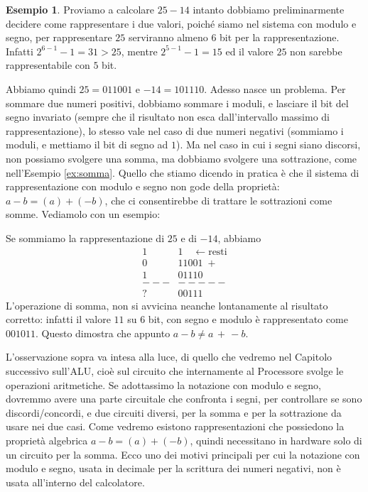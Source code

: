 \documentclass[a4paper]{book}
\theoremstyle{definition}
\newtheorem{ex}{Esempio}
\begin{document}
\begin{ex} Proviamo a calcolare $25 - 14$ intanto dobbiamo preliminarmente decidere come rappresentare i due valori, poiché siamo nel sistema con modulo e segno, per rappresentare $25$ serviranno almeno $6$ bit per la rappresentazione. Infatti $2^{6-1}-1 = 31 > 25$, mentre $2^{5-1}-1 = 15$ ed il valore $25$ non sarebbe rappresentabile con $5$ bit. 

Abbiamo quindi $25 = 011001$ e  $-14 = 101110$. Adesso nasce un problema. 
Per sommare due numeri positivi, dobbiamo sommare i moduli, e lasciare il bit
del segno invariato (sempre che il risultato non esca dall'intervallo massimo
di rappresentazione), lo stesso vale nel caso di due numeri negativi (sommiamo
i moduli, e mettiamo il bit di segno ad $1$). Ma nel caso in cui i segni siano
discorsi, non possiamo svolgere una somma, ma dobbiamo svolgere una sottrazione,
come nell'Esempio \ref{ex:somma}. Quello che stiamo dicendo in pratica è che
il sistema di rappresentazione con modulo e segno non gode della proprietà: $a-b = (a)+(-b)$, che ci consentirebbe di trattare le sottrazioni come somme. Vediamolo con un esempio:

Se sommiamo la rappresentazione di $25$ e di $-14$, abbiamo
\begin{align*}
	    1&1 \quad \leftarrow\text{resti}\\ 
	    0&11001 \;+\\
	    1&01110\\
      ---&-----\\
	    ?&00111
\end{align*} L'operazione di somma, non si avvicina neanche lontanamente
al risultato corretto: infatti il valore $11$ su $6$ bit, con segno e modulo è rappresentato come $001011$. Questo dimostra che appunto $a-b \neq a \,+\, -b$.
\end{ex}

L'osservazione sopra va intesa alla luce, di quello che vedremo nel Capitolo successivo sull'ALU, cioè sul circuito che internamente al Processore svolge le
operazioni aritmetiche. Se adottassimo la notazione con modulo e segno, dovremmo avere una parte circuitale che confronta i segni, per controllare se
sono discordi/concordi, e due circuiti diversi, per la somma e per la sottrazione da usare nei due casi. Come vedremo esistono
rappresentazioni che possiedono la proprietà algebrica $a-b = (a)+(-b)$,
quindi necessitano in hardware solo di un circuito per la somma. Ecco
uno dei motivi principali per cui la notazione con modulo e segno, usata
in decimale per la scrittura dei numeri negativi, non è usata all'interno del calcolatore.
\end{document}

